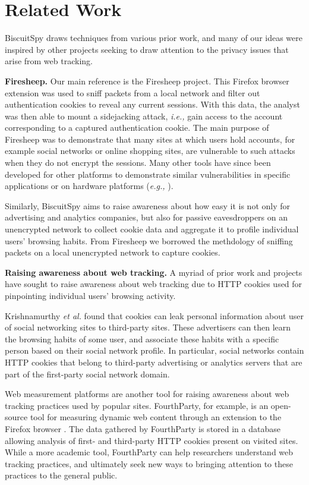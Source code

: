 \section{Related Work}
\label{sec:related}

BiscuitSpy draws techniques from various prior work, and many of our ideas were inspired by other projects seeking to draw attention to the privacy issues that arise from web tracking.

\textbf{Firesheep.} Our main reference is the Firesheep project\cite{firesheep}.
This Firefox browser extension was used to sniff packets from a local network and filter out authentication cookies to reveal any current sessions.
With this data, the analyst was then able to mount a sidejacking attack, \emph{i.e.,} gain access to the account corresponding to a captured authentication cookie.
The main purpose of Firesheep was to demonstrate that many sites at which users hold accounts, for example social networks or online shopping sites, are vulnerable to such attacks when they do not encrypt the sessions.
Many other tools have since been developed for other platforms to demonstrate similar vulnerabilities in specific applications or on hardware platforms (\emph{e.g.,} \cite{droidsheep}).

Similarly, BiscuitSpy aims to raise awareness about how easy it is not only for advertising and analytics companies, but also for passive eavesdroppers on an unencrypted network to collect cookie data and aggregate it to profile individual users' browsing habits.
From Firesheep we borrowed the methdology of sniffing packets on a local unencrypted network to capture cookies.

\textbf{Raising awareness about web tracking.} A myriad of prior work and projects have sought to raise awareness about web tracking due to HTTP cookies used for pinpointing individual users' browsing activity. 

Krishnamurthy \emph{et al.} \cite{piiosn} found that cookies can leak personal information about user of social networking sites to third-party sites. 
These advertisers can then learn the browsing habits of some user, and associate these habits with a specific person based on their social network profile. 
In particular, social networks contain HTTP cookies that belong to third-party advertising or analytics servers that are part of the first-party social network domain.

Web measurement platforms are another tool for raising awareness about web tracking practices used by popular sites.
FourthParty, for example, is an open-source tool for measuring dynamic web content through an extension to the Firefox browser \cite{fourthparty}.
The data gathered by FourthParty is stored in a database allowing analysis of first- and third-party HTTP cookies present on visited sites.
While a more academic tool, FourthParty can help researchers understand web tracking practices, and ultimately seek new ways to bringing attention to these practices to the general public. 